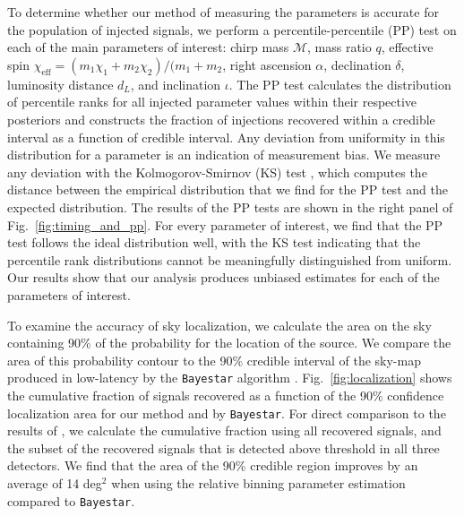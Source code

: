 To determine whether our method of measuring the parameters is accurate for the population of injected signals, we perform a percentile-percentile (PP) test on each of the main parameters of interest: chirp mass $\mathcal{M}$, mass ratio $q$, effective spin $\chi_{\mathrm{eff}}=(m_{1}\chi_{1}+m_{2}\chi_{2})/(m_{1}+m_{2}$, right ascension $\alpha$, declination $\delta$, luminosity distance $d_L$, and inclination $\iota$. The PP test calculates the distribution of percentile ranks for all injected parameter values within their respective posteriors and constructs the fraction of injections recovered within a credible interval as a function of credible interval. Any deviation from uniformity in this distribution for a parameter is an indication of measurement bias. We measure any deviation with the Kolmogorov-Smirnov (KS) test \cite{10.2307/2280095}, which computes the distance between the empirical distribution that we find for the PP test and the expected distribution. The results of the PP tests are shown in the right panel of Fig.~\ref{fig:timing_and_pp}. For every parameter of interest, we find that the PP test follows the ideal distribution well, with the KS test indicating that the percentile rank distributions cannot be meaningfully distinguished from uniform. Our results show that our analysis produces unbiased estimates for each of the parameters of interest.

To examine the accuracy of sky localization, we calculate the area on the sky containing 90\% of the probability for the location of the source. We compare the area of this probability contour to the 90\% credible interval of the sky-map produced in low-latency by the \texttt{Bayestar} algorithm \cite{Singer_2016}. Fig.~\ref{fig:localization} shows the cumulative fraction of signals recovered as a function of the 90\% confidence localization area for our method and by \texttt{Bayestar}. For direct comparison to the results of \cite{Singer_2016}, we calculate the cumulative fraction using all recovered signals, and the subset of the recovered signals that is detected above threshold in all three detectors.  We find that the area of the 90\% credible region improves by an average of 14 deg$^2$ when using the relative binning parameter estimation compared to \texttt{Bayestar}.

